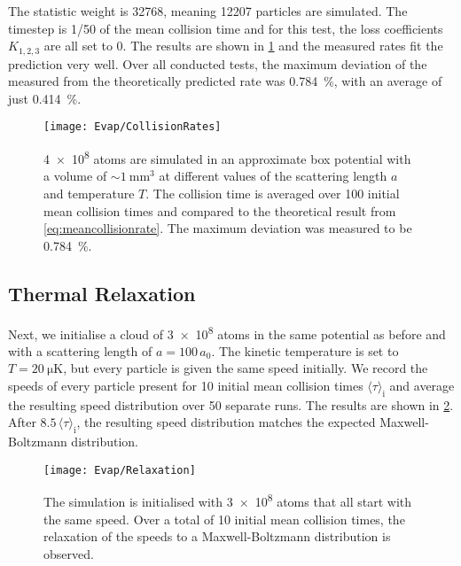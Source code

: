 The statistic weight is \num{32768}, meaning \num{12207} particles are simulated. The timestep is 1/50 of the mean collision time and for this test, the loss coefficients $K_{1,2,3}$ are all set to 0. The results are shown in \cref{fig:evap_test_rates} and the measured rates fit the prediction very well. Over all conducted tests, the maximum deviation of the measured from the theoretically predicted rate was \SI{.784}{\percent}, with an average of just \SI{.414}{\percent}.

\vfill
\begin{figure}[hbp]
    \centering
    \texttt{[image: Evap/CollisionRates]}
    \caption[Collision rate variation with temperature and scattering length]{\num{4e8} atoms are simulated in an approximate box potential with a volume of $\sim\!\SI{1}{\milli\meter\cubed}$ at different values of the scattering length $a$ and temperature $T$. The collision time is averaged over 100 initial mean collision times and compared to the theoretical result from \cref{eq:meancollisionrate}. The maximum deviation was measured to be \SI{.784}{\percent}.}
    \label{fig:evap_test_rates}
\end{figure}
\vfill


\subsection{Thermal Relaxation}
Next, we initialise a cloud of \num{3e8} atoms in the same potential as before and with a scattering length of $a = 100\, a_0$. The kinetic temperature is set to $T=\SI{20}{\micro\kelvin}$, but every particle is given the same speed initially. We record the speeds of every particle present for 10 initial mean collision times ${\langle \tau\rangle}_\text{i}$ and average the resulting speed distribution over 50 separate runs. The results are shown in \cref{fig:evap_relaxation}. After $\num{8.5}\,{\langle \tau\rangle}_\text{i}$, the resulting speed distribution matches the expected Maxwell-Boltzmann distribution.
\begin{figure}[htbp]
    \centering
    \texttt{[image: Evap/Relaxation]}
    \caption[Relaxation to a Maxwell-Boltzmann distribution]{The simulation is initialised with \num{3e8} atoms that all start with the same speed. Over a total of 10 initial mean collision times, the relaxation of the speeds to a Maxwell-Boltzmann distribution is observed.}
    \label{fig:evap_relaxation}
\end{figure}

